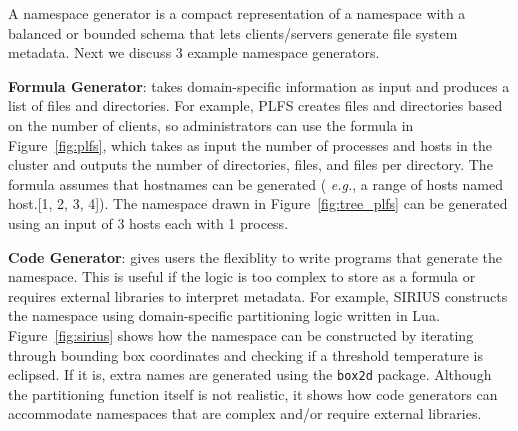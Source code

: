 A namespace generator is a compact representation of a namespace with a
balanced or bounded schema that lets clients/servers generate file system
metadata. Next we discuss 3 example namespace generators.



\textbf{Formula Generator}: takes domain-specific information as input and
produces a list of files and directories.  For example, PLFS creates files and
directories based on the number of clients, so administrators can use the
formula in Figure~\ref{fig:plfs}, which takes as input the number of processes
and hosts in the cluster and outputs the number of directories, files, and
files per directory.  The formula assumes that hostnames can be generated ({\it
e.g.}, a range of hosts named host.[1, 2, 3, 4]). The namespace drawn in
Figure~\ref{fig:tree_plfs} can be generated using an input of 3 hosts each with
1 process.


\textbf{Code Generator}: gives users the flexiblity to write programs that
generate the namespace. This is useful if the logic is too complex to store as
a formula or requires external libraries to interpret metadata. For example,
SIRIUS constructs the namespace using domain-specific partitioning logic
written in Lua.  Figure~\ref{fig:sirius} shows how the namespace can be
constructed by iterating through  bounding box coordinates and checking if a
threshold temperature is eclipsed. If it is, extra names are generated using
the \texttt{box2d} package.  Although the partitioning function itself is not
realistic, it shows how code generators can accommodate namespaces that are
complex and/or require external libraries.  

